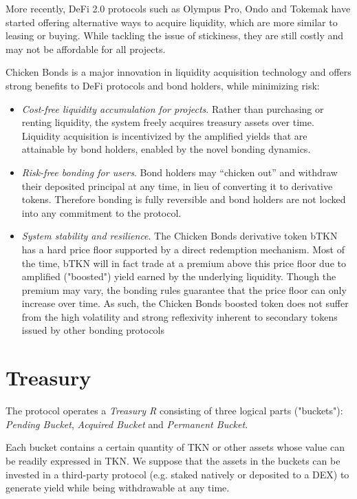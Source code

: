 \documentclass{article}
\begin{document}
More recently, DeFi 2.0 protocols such as Olympus Pro, Ondo and Tokemak have started offering alternative ways to acquire liquidity, which are more similar to leasing or buying. While tackling the issue of stickiness, they are still costly and may not be affordable for all projects.

Chicken Bonds is a major innovation in liquidity acquisition technology and offers strong benefits to DeFi protocols and bond holders, while minimizing risk:

\begin{itemize}
    \item \textit{Cost-free liquidity accumulation for projects}. Rather than purchasing or renting liquidity, the system freely acquires treasury assets over time. Liquidity acquisition is incentivized by the amplified yields that are attainable by bond holders, enabled by the novel bonding dynamics.
    \item \textit{Risk-free bonding for users}. Bond holders may “chicken out” and withdraw their deposited principal at any time, in lieu of converting it to derivative tokens. Therefore bonding is fully reversible and bond holders are not locked into any commitment to the protocol.
    \item \textit{System stability and resilience}. The Chicken Bonds derivative token bTKN has a hard price floor supported by a direct redemption mechanism. Most of the time, bTKN will in fact trade at a premium above this price floor due to amplified ("boosted") yield earned by the underlying liquidity. Though the premium may vary, the bonding rules guarantee that the price floor can only increase over time. As such, the Chicken Bonds boosted token does not suffer from the high volatility and strong reflexivity inherent to secondary tokens issued by other bonding protocols
\end{itemize}

\section{Treasury}
The protocol operates a \textit{Treasury R} consisting of three logical parts ("buckets"):  \textit{Pending Bucket}, \textit{Acquired Bucket} and \textit{Permanent Bucket}.

Each bucket contains a certain quantity of TKN or other assets whose value can be readily expressed in TKN. We suppose that the assets in the buckets can be invested in a third-party protocol (e.g. staked natively or deposited to a DEX) to generate yield while being withdrawable at any time. 
\end{document}

